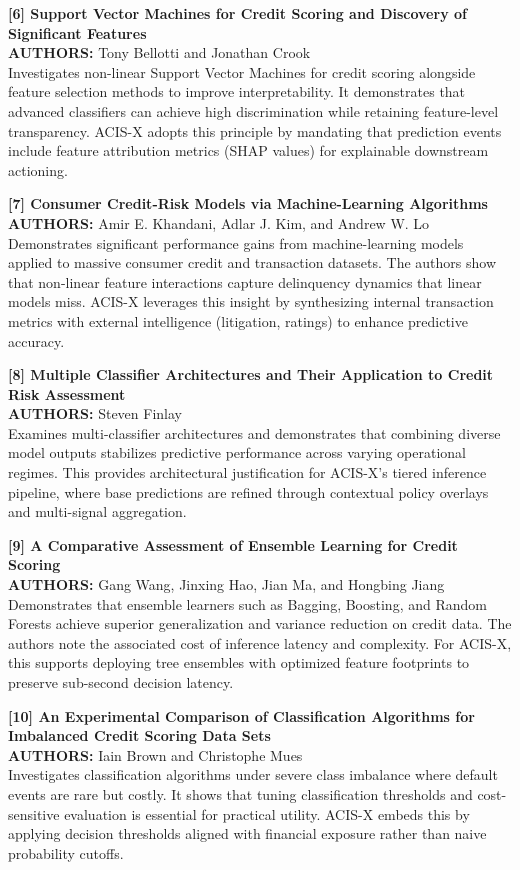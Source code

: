 \documentclass[a4paper, 12pt]{report}
\begin{document}
\noindent \textbf{[6] Support Vector Machines for Credit Scoring and Discovery of Significant Features}\\
\textbf{AUTHORS:} Tony Bellotti and Jonathan Crook\\
Investigates non-linear Support Vector Machines for credit scoring alongside feature selection methods to improve interpretability. It demonstrates that advanced classifiers can achieve high discrimination while retaining feature-level transparency. ACIS-X adopts this principle by mandating that prediction events include feature attribution metrics (SHAP values) for explainable downstream actioning.

\noindent \textbf{[7] Consumer Credit-Risk Models via Machine-Learning Algorithms}\\
\textbf{AUTHORS:} Amir E. Khandani, Adlar J. Kim, and Andrew W. Lo\\
Demonstrates significant performance gains from machine-learning models applied to massive consumer credit and transaction datasets. The authors show that non-linear feature interactions capture delinquency dynamics that linear models miss. ACIS-X leverages this insight by synthesizing internal transaction metrics with external intelligence (litigation, ratings) to enhance predictive accuracy.

\noindent \textbf{[8] Multiple Classifier Architectures and Their Application to Credit Risk Assessment}\\
\textbf{AUTHORS:} Steven Finlay\\
Examines multi-classifier architectures and demonstrates that combining diverse model outputs stabilizes predictive performance across varying operational regimes. This provides architectural justification for ACIS-X's tiered inference pipeline, where base predictions are refined through contextual policy overlays and multi-signal aggregation.

\noindent \textbf{[9] A Comparative Assessment of Ensemble Learning for Credit Scoring}\\
\textbf{AUTHORS:} Gang Wang, Jinxing Hao, Jian Ma, and Hongbing Jiang\\
Demonstrates that ensemble learners such as Bagging, Boosting, and Random Forests achieve superior generalization and variance reduction on credit data. The authors note the associated cost of inference latency and complexity. For ACIS-X, this supports deploying tree ensembles with optimized feature footprints to preserve sub-second decision latency.

\noindent \textbf{[10] An Experimental Comparison of Classification Algorithms for Imbalanced Credit Scoring Data Sets}\\
\textbf{AUTHORS:} Iain Brown and Christophe Mues\\
Investigates classification algorithms under severe class imbalance where default events are rare but costly. It shows that tuning classification thresholds and cost-sensitive evaluation is essential for practical utility. ACIS-X embeds this by applying decision thresholds aligned with financial exposure rather than naive probability cutoffs.
\end{document}
